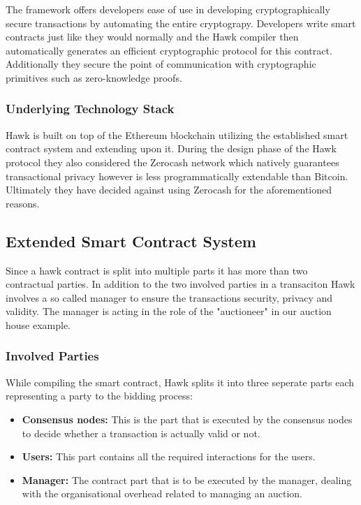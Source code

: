 The framework offers developers ease of use in developing cryptographically secure transactions by automating the entire cryptograpy. Developers write smart contracts just like they would normally and the Hawk compiler then automatically generates an efficient cryptographic protocol for this contract. Additionally they secure the point of communication with cryptographic primitives such as zero-knowledge proofs.\cite[p.839-840]{Hawk}

\subsubsection{Underlying Technology Stack}
Hawk is built on top of the Ethereum blockchain utilizing the established smart contract system and extending upon it. During the design phase of the Hawk protocol they also considered the Zerocash network which natively guarantees transactional privacy however is less programmatically extendable than Bitcoin. Ultimately they have decided against using Zerocash for the aforementioned reasons.\cite[p.841]{Hawk}

\subsection{Extended Smart Contract System}
Since a hawk contract is split into multiple parts it has more than two contractual parties. In addition to the two involved parties in a transaciton Hawk involves a so called manager to ensure the transactions security, privacy and validity. The manager is acting in the role of the "auctioneer" in our auction house example. 

\subsubsection{Involved Parties}
While compiling the smart contract, Hawk splits it into three seperate parts each representing a party to the bidding process:\cite[p.840]{Hawk}
\begin{itemize}
\item \textbf{Consensus nodes:}
This is the part that is executed by the consensus nodes to decide whether a transaction is actually valid or not.
\item \textbf{Users:}
This part contains all the required interactions for the users.
\item \textbf{Manager:}
The contract part that is to be executed by the manager, dealing with the organisational overhead related to managing an auction.
\end{itemize}

